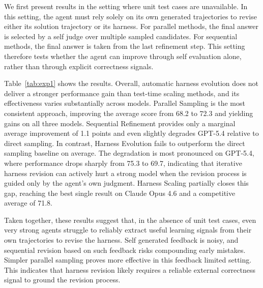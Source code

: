 \documentclass{article}
\begin{document}
We first present results in the setting where unit test cases are unavailable. In this setting, the agent must rely solely on its own generated trajectories to revise either its solution trajectory or its harness. For parallel methods, the final answer is selected by a self judge over multiple sampled candidates. For sequential methods, the final answer is taken from the last refinement step. This setting therefore tests whether the agent can improve through self evaluation alone, rather than through explicit correctness signals.

Table~\ref{tab:exp1} shows the results. Overall, automatic harness evolution does not deliver a stronger performance gain than test-time scaling methods, and its effectiveness varies substantially across models. 
Parallel Sampling is the most consistent approach, improving the average score from 68.2 to 72.3 and yielding gains on all three models. Sequential Refinement provides only a marginal average improvement of 1.1 points and even slightly degrades GPT-5.4 relative to direct sampling.
In contrast, Harness Evolution fails to outperform the direct sampling baseline on average. The degradation is most pronounced on GPT-5.4, where performance drops sharply from 75.3 to 69.7, indicating that iterative harness revision can actively hurt a strong model when the revision process is guided only by the agent's own judgment. Harness Scaling partially closes this gap, reaching the best single result on Claude Opus 4.6 and a competitive average of 71.8. 

Taken together, these results suggest that, in the absence of unit test cases, even very strong agents struggle to reliably extract useful learning signals from their own trajectories to revise the harness. Self generated feedback is noisy, and sequential revision based on such feedback risks compounding early mistakes. Simpler parallel sampling proves more effective in this feedback limited setting. This indicates that harness revision  likely requires a reliable external correctness signal to ground the revision process.
\end{document}
